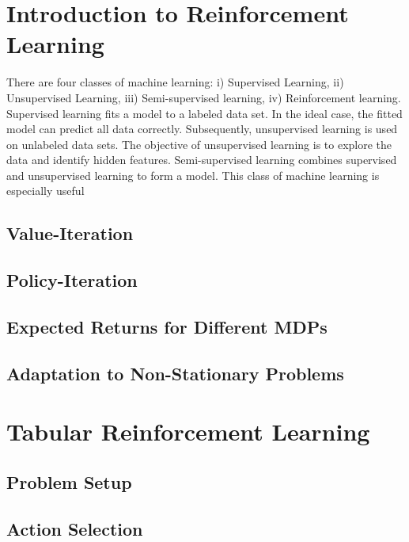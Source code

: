 \section{Introduction to Reinforcement Learning}

There are four classes of machine learning: i) Supervised Learning, ii) Unsupervised Learning, iii) Semi-supervised learning, iv) Reinforcement learning.  Supervised learning fits a model to a labeled data set.  In the ideal case, the fitted model can predict all data correctly.  Subsequently, unsupervised learning is used on unlabeled data sets.  The objective of unsupervised learning is to explore the data and identify hidden features. Semi-supervised learning combines supervised and unsupervised learning to form a model.  This class of machine learning is especially useful 



\subsection{Value-Iteration}
\subsection{Policy-Iteration}
\subsection{Expected Returns for Different MDPs}
\subsection{Adaptation to Non-Stationary Problems}




\section{Tabular Reinforcement Learning}
\subsection{Problem Setup}
\subsection{Action Selection}
